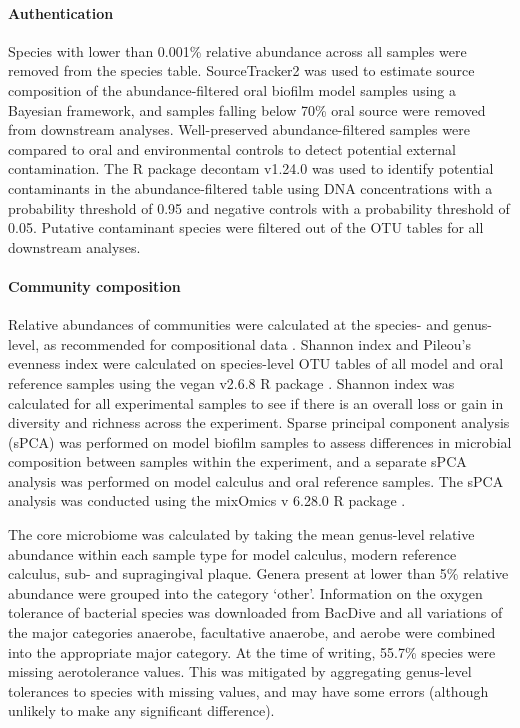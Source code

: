 \documentclass[10pt,a4paper]{article}
\begin{document}
\paragraph{Authentication}\label{authentication}

Species with lower than 0.001\% relative abundance across all samples
were removed from the species table. SourceTracker2
\citep{knightsSourceTracker2011} was used to estimate source composition
of the abundance-filtered oral biofilm model samples using a Bayesian
framework, and samples falling below 70\% oral source were removed from
downstream analyses. Well-preserved abundance-filtered samples were
compared to oral and environmental controls to detect potential external
contamination. The R package decontam v1.24.0 \citep{Rdecontam} was used
to identify potential contaminants in the abundance-filtered table using
DNA concentrations with a probability threshold of 0.95 and negative
controls with a probability threshold of 0.05. Putative contaminant
species were filtered out of the OTU tables for all downstream analyses.

\paragraph{Community composition}\label{community-composition}

Relative abundances of communities were calculated at the species- and
genus-level, as recommended for compositional data
\citep{gloorMicrobiomeDatasets2017}. Shannon index and Pileou's evenness
index were calculated on species-level OTU tables of all model and oral
reference samples using the vegan v2.6.8 R package \citep{Rvegan}.
Shannon index was calculated for all experimental samples to see if
there is an overall loss or gain in diversity and richness across the
experiment. Sparse principal component analysis (sPCA) was performed on
model biofilm samples to assess differences in microbial composition
between samples within the experiment, and a separate sPCA analysis was
performed on model calculus and oral reference samples. The sPCA
analysis was conducted using the mixOmics v 6.28.0 R package
\citep{RmixOmics}.

The core microbiome was calculated by taking the mean genus-level
relative abundance within each sample type for model calculus, modern
reference calculus, sub- and supragingival plaque. Genera present at
lower than 5\% relative abundance were grouped into the category
`other'. Information on the oxygen tolerance of bacterial species was
downloaded from BacDive \citep{reimerBacDive2022} and all variations of
the major categories anaerobe, facultative anaerobe, and aerobe were
combined into the appropriate major category. At the time of writing,
55.7\% species were missing aerotolerance values. This was mitigated by
aggregating genus-level tolerances to species with missing values, and
may have some errors (although unlikely to make any significant
difference).
\end{document}
